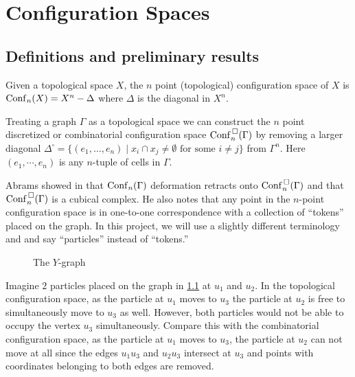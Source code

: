 \chapter{Configuration Spaces}

\section{Definitions and preliminary results}
Given a topological space \(X\), the \(n\) point (topological) configuration space of \(X\) is
\(\mathrm{Conf}_n(X) = X^n - \Delta\) where \(\Delta\) is the diagonal in \(X^n\).

Treating a graph \(\Gamma\) as a topological space we can construct the
\(n\) point discretized or combinatorial configuration space \(\mathrm{Conf}^{\,\square}_n(\Gamma)\) by 
removing a larger diagonal \(\Delta^{\square} = \{(e_1, \ldots, e_n) \mid x_i \cap x_j \neq \emptyset \text{ for some } i \neq j\}\)
from \(\Gamma^n\). Here \((e_1, \cdots, e_n)\) is any \(n\)-tuple of cells in \(\Gamma\).

Abrams showed in \cite{abrams2000configurationspaces} that \(\mathrm{Conf}_n(\Gamma)\) deformation retracts onto \(\mathrm{Conf}^{\,\square}_n(\Gamma)\) and
that \(\mathrm{Conf}^{\,\square}_n(\Gamma)\) is a cubical complex.
He also notes that any point in the
\(n\)-point configuration space is in one-to-one correspondence with a
collection of ``tokens'' placed on the graph. In this project, we will use a slightly different terminology and
and say ``particles'' instead of ``tokens.''


\begin{figure}[h!]
\centering
{}
\caption{The \(Y\)-graph}
\label{fig:ygraph}
\end{figure}
Imagine \(2\) particles placed on the graph in \ref{fig:ygraph} at \(u_1\) and \(u_2\).  
In the topological configuration space, as the particle at \(u_1\) moves to \(u_3\)
the particle at \(u_2\) is free to simultaneously move to \(u_3\) as well. 
However, both particles would not be able to occupy the vertex \(u_3\) simultaneously.  
Compare this with the combinatorial configuration space, as the
particle at \(u_1\) moves to \(u_3\), the particle at \(u_2\) can not move at
all since the edges \(u_1 u_3\) and \(u_2 u_3\) intersect at \(u_3\) and points
with coordinates belonging to both edges are removed.

